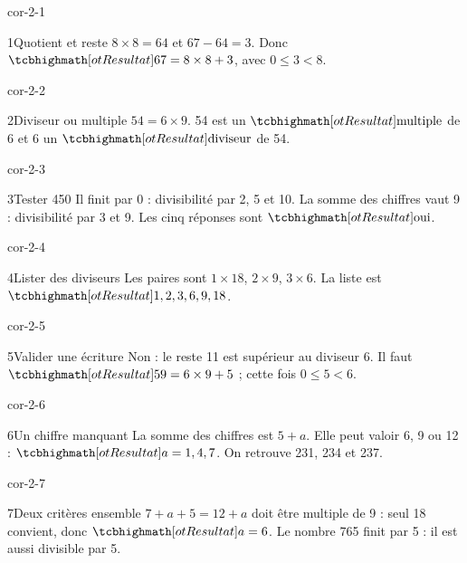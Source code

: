 \clearpage\pagestyle{otMain}\setlength{\otBlocEspacement}{2.5mm}\fontsize{11}{15}\selectfont{}
\begin{blocLivre}{cor-2-1}\begin{corrige}{1}{Quotient et reste}
$8\times8=64$ et $67-64=3$. Donc $\res{67=8\times8+3}$, avec $0\le3<8$.
\end{corrige}\end{blocLivre}
\begin{blocLivre}{cor-2-2}\begin{corrige}{2}{Diviseur ou multiple}
$54=6\times9$. 54 est un $\res{\text{multiple}}$ de 6 et 6 un $\res{\text{diviseur}}$ de 54.
\end{corrige}\end{blocLivre}
\begin{blocLivre}{cor-2-3}\begin{corrige}{3}{Tester 450}
Il finit par 0 : divisibilité par 2, 5 et 10. La somme des chiffres vaut 9 : divisibilité par 3 et 9. Les cinq réponses sont $\res{\text{oui}}$.
\end{corrige}\end{blocLivre}
\begin{blocLivre}{cor-2-4}\begin{corrige}{4}{Lister des diviseurs}
Les paires sont $1\times18$, $2\times9$, $3\times6$. La liste est $\res{1,2,3,6,9,18}$.
\end{corrige}\end{blocLivre}
\begin{blocLivre}{cor-2-5}\begin{corrige}{5}{Valider une écriture}
Non : le reste 11 est supérieur au diviseur 6. Il faut $\res{59=6\times9+5}$ ; cette fois $0\le5<6$.
\end{corrige}\end{blocLivre}
\begin{blocLivre}{cor-2-6}\begin{corrige}{6}{Un chiffre manquant}
La somme des chiffres est $5+a$. Elle peut valoir 6, 9 ou 12 : $\res{a=1,4,7}$. On retrouve 231, 234 et 237.
\end{corrige}\end{blocLivre}
\begin{blocLivre}{cor-2-7}\begin{corrige}{7}{Deux critères ensemble}
$7+a+5=12+a$ doit être multiple de 9 : seul 18 convient, donc $\res{a=6}$. Le nombre 765 finit par 5 : il est aussi divisible par 5.
\end{corrige}\end{blocLivre}
